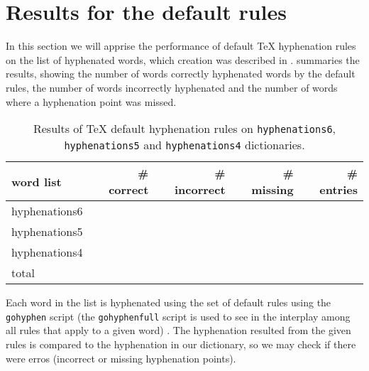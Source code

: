 \section{Results for the default rules}

In this section we will apprise the performance of default \TeX{} hyphenation
rules on the list of hyphenated words, which creation was described in
.  summaries the results, showing
the number of words correctly hyphenated words by the default rules, the number
of words incorrectly hyphenated and the number of words where a hyphenation point
was missed.

\begin{table}[htbp]
\centering
\caption{Results of \TeX{} default hyphenation rules on \texttt{hyphenations6}, \texttt{hyphenations5} and \texttt{hyphenations4} dictionaries.}
\label{tab-default-results}
\begin{tabular}{lrrrr}
\toprule
word list 	& \# correct 		& \# incorrect		& \# missing 		& \# entries 		\\
\midrule
hyphenations6 	& \NumberOfCorrectSix{}	& \NumberOfWrongSix{}	& \NumberOfMissingSix{}	& \NumberOfTotalSix{} 	\\
hyphenations5 	& \NumberOfCorrectFive{}& \NumberOfWrongFive{}	& \NumberOfMissingFive{}& \NumberOfTotalFive{} 	\\
hyphenations4 	& \NumberOfCorrectFour{}& \NumberOfWrongFour{}	& \NumberOfMissingFour{}& \NumberOfTotalFour{} 	\\
total		& \NumberOfCorrectSum{} & \NumberOfWrongSum{} 	& \NumberOfMissingSum{}	& \NumberOfTotalSum{}   \\
\bottomrule
\end{tabular}
\end{table}

Each word in the list is hyphenated using the set of default rules using the \texttt{gohyphen} script
(the \texttt{gohyphenfull} script is used to see in the interplay among all rules that apply to a given word) \parencite{gundlach2021}.
The hyphenation resulted from the given rules is compared to the hyphenation in our dictionary, so
we may check if there were erros (incorrect or missing hyphenation points).



